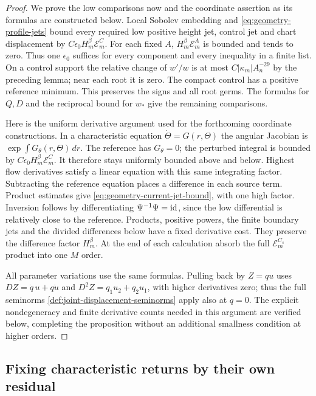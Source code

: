 \begin{proof}
We prove the low comparisons now and the coordinate assertion as its
formulas are constructed below. Local Sobolev embedding and
\eqref{eq:geometry-profile-jets} bound every required low positive
height jet, control jet and chart displacement by
$C\epsilon_0H_m^\beta\mathcal E_m^C$. For each fixed $A$,
$H_m^\beta\mathcal E_m^A$ is bounded and tends to zero. Thus one
$\epsilon_0$ suffices for every component and every inequality in a
finite list. On a control support the relative change of $w'/w$ is
at most $C|\kappa_m|A_n^{-29}$ by the preceding lemma; near each
root it is zero. The compact control has a positive reference minimum.
This preserves the signs and all root germs. The formulas for $Q,D$
and the reciprocal bound for $w_*$ give the remaining comparisons.

Here is the uniform derivative argument used for the forthcoming
coordinate constructions. In a characteristic equation
$\dot\Theta=G(r,\Theta)$ the angular Jacobian is
$\exp\int G_\theta(r,\Theta)\,dr$. The reference has $G_\theta=0$;
the perturbed integral is bounded by
$C\epsilon_0H_m^\beta\mathcal E_m^C$. It therefore stays uniformly
bounded above and below. Highest flow derivatives satisfy a linear
equation with this same integrating factor. Subtracting the reference
equation places a difference in each source term. Product estimates
give \eqref{eq:geometry-current-jet-bound}, with one high factor.
Inversion follows by differentiating $\Psi^{-1}\Psi=\mathrm{id}$, since
the low differential is relatively close to the reference.
Products, positive powers, the finite boundary jets and the divided
differences below have a fixed derivative cost. They preserve the
difference factor $H_m^\beta$. At the end of each calculation absorb
the full $\mathcal E_m^{C_s}$ product into one $M$ order.

All parameter variations use the same formulas. Pulling back by
$Z=qu$ uses $DZ=\dot q\,u+q\dot u$ and
$D^2Z=q_1u_2+q_2u_1$, with higher derivatives zero; thus the full
seminorms \eqref{def:joint-displacement-seminorms} apply also at $q=0$.
The explicit nondegeneracy and finite derivative counts needed in this
argument are verified below, completing the proposition without an
additional smallness condition at higher orders.
\end{proof}

\subsection{Fixing characteristic returns by their own residual}

